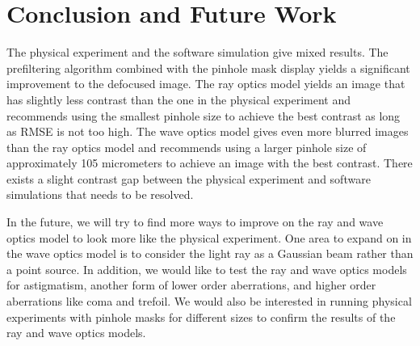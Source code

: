 \section{Conclusion and Future Work}

The physical experiment and the software simulation give mixed results. The prefiltering algorithm combined with the pinhole mask display yields a significant improvement to the defocused image. The ray optics model yields an image that has slightly less contrast than the one in the physical experiment and recommends using the smallest pinhole size to achieve the best contrast as long as RMSE is not too high. The wave optics model gives even more blurred images than the ray optics model and recommends using a larger pinhole size of approximately 105 micrometers to achieve an image with the best contrast. There exists a slight contrast gap between the physical experiment and software simulations that needs to be resolved.

In the future, we will try to find more ways to improve on the ray and wave optics model to look more like the physical experiment. One area to expand on in the wave optics model is to consider the light ray as a Gaussian beam rather than a point source. In addition, we would like to test the ray and wave optics models for astigmatism, another form of lower order aberrations, and higher order aberrations like coma and trefoil. We would also be interested in running physical experiments with pinhole masks for different sizes to confirm the results of the ray and wave optics models. 